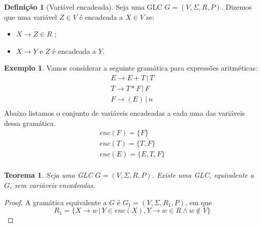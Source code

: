 \documentclass[a4paper]{article}
\newtheorem{Theorem}{Teorema}
\theoremstyle{definition}
\newtheorem{Example}{Exemplo}
\newtheorem{Definition}{Definição}
\begin{document}
  \begin{Definition}[Variável encadeada]
    Seja uma GLC $G=(V,\Sigma,R,P)$. Dizemos que uma variável $Z \in V$ é
    encadeada a $X \in V$ se:
    \begin{itemize}
       \item $X \to Z \in R$ ;
       \item $X \to Y$ e $Z$ é encadeada a $Y$. 
    \end{itemize}
  \end{Definition}

  \begin{Example}
    Vamos considerar a seguinte gramática para expressões aritméticas:
    \[
      \begin{array}{l}
        E \to E + T \,|\, T\\
        T \to T * F \,|\, F \\
        F \to (E) \,|\, n \\
      \end{array}
    \]
    Abaixo listamos o conjunto de variáveis encadeadas a cada uma das variáveis
    dessa gramática.
    \[
      \begin{array}{l}
      enc(F) =\{F\} \\
      enc(T) = \{T,F\} \\
        enc(E) = \{E,T,F\}\\
      \end{array}
    \]
  \end{Example}

  \begin{Theorem}
     Seja uma GLC $G=(V,\Sigma,R,P)$. Existe uma GLC, equivalente a $G$, sem
     variáveis encadeadas.
   \end{Theorem}
   \begin{proof}
     A gramática equivalente a $G$ é $G_1=(V,\Sigma,R_1,P)$, em que
     \[
       R_1 = \{X \to w \,|\, Y \in enc(X), Y \to w \in R \land w \not\in V\}
     \]
   \end{proof}
\end{document}

